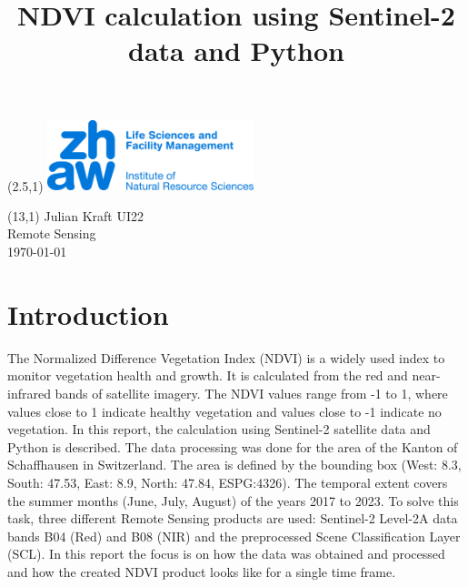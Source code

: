 \documentclass{article}
\title{NDVI calculation using Sentinel-2 data and Python}
\makeatletter
\renewcommand{\maketitle}{
  \begin{flushleft} 
    \Large\textmd{\@title} 
    \par
  \end{flushleft}
}
\makeatother
\begin{document}
\begin{textblock}{1}(2.5,1) %
        \includegraphics[width=6cm]{logo.jpg} %
\end{textblock}

\begin{textblock}{6}(13,1) %
        \raggedleft
        Julian Kraft UI22\\
        Remote Sensing\\
        \today
\end{textblock}

\vspace*{1.5cm}


\maketitle

\section*{Introduction}

The Normalized Difference Vegetation Index (NDVI) is a widely used index to monitor vegetation health and growth. 
It is calculated from the red and near-infrared bands of satellite imagery. The NDVI values range from -1 to 1, 
where values close to 1 indicate healthy vegetation and values close to -1 indicate no vegetation. In this report, 
the calculation using Sentinel-2 satellite data and Python is described. 
The data processing was done for the area of the Kanton of Schaffhausen in Switzerland. The area is defined by the bounding box
(West: 8.3, South: 47.53, East: 8.9, North: 47.84, ESPG:4326). 
The temporal extent covers the summer months (June, July, August) of the years 2017 to 2023.
To solve this task,
three different Remote Sensing products are used: Sentinel-2 Level-2A data bands B04 (Red) and B08 (NIR) and the
preprocessed Scene Classification Layer (SCL). In this report the focus is on how the data was obtained and processed
and how the created NDVI product looks like for a single time frame.\\
\end{document}
